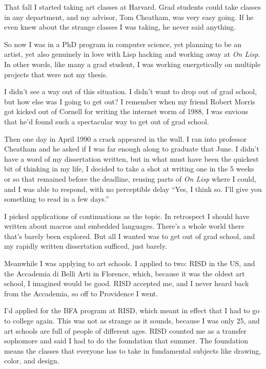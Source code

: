 That fall I started taking art classes at Harvard. Grad students could
take classes in any department, and my advisor, Tom Cheatham, was very
easy going. If he even knew about the strange classes I was taking, he
never said anything.

So now I was in a PhD program in computer science, yet planning to be an
artist, yet also genuinely in love with Lisp hacking and working away at
\emph{On Lisp}. In other words, like many a grad student, I was working
energetically on multiple projects that were not my thesis.

I didn't see a way out of this situation. I didn't want to drop out of
grad school, but how else was I going to get out? I remember when my
friend Robert Morris got kicked out of Cornell for writing the internet
worm of 1988, I was envious that he'd found such a spectacular way to
get out of grad school.

Then one day in April 1990 a crack appeared in the wall. I ran into
professor Cheatham and he asked if I was far enough along to graduate
that June. I didn't have a word of my dissertation written, but in what
must have been the quickest bit of thinking in my life, I decided to
take a shot at writing one in the 5 weeks or so that remained before the
deadline, reusing parts of \emph{On Lisp} where I could, and I was able
to respond, with no perceptible delay ``Yes, I think so. I'll give you
something to read in a few days.''

I picked applications of continuations as the topic. In retrospect I
should have written about macros and embedded languages. There's a whole
world there that's barely been explored. But all I wanted was to get out
of grad school, and my rapidly written dissertation sufficed, just
barely.

Meanwhile I was applying to art schools. I applied to two: RISD in the
US, and the Accademia di Belli Arti in Florence, which, because it was
the oldest art school, I imagined would be good. RISD accepted me, and I
never heard back from the Accademia, so off to Providence I went.

I'd applied for the BFA program at RISD, which meant in effect that I
had to go to college again. This was not as strange as it sounds,
because I was only 25, and art schools are full of people of different
ages. RISD counted me as a transfer sophomore and said I had to do the
foundation that summer. The foundation means the classes that everyone
has to take in fundamental subjects like drawing, color, and design.

